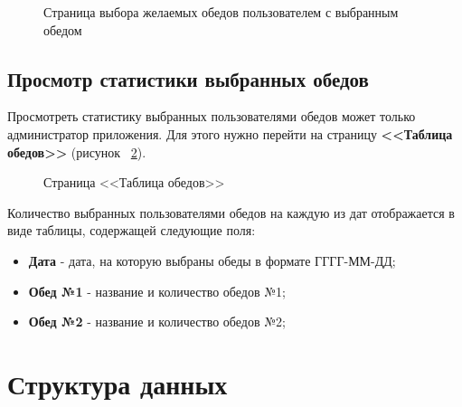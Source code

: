 \documentclass[a4paper]{article}
\begin{document}
\begin{figure}[h!]
\caption{Страница выбора желаемых обедов пользователем с выбранным обедом}
\label{fig:image17}
\end{figure}

\subsection{Просмотр статистики выбранных обедов}

Просмотреть статистику выбранных пользователями обедов может только администратор приложения. Для этого нужно перейти на страницу \textbf{<<Таблица обедов>>} (рисунок ~\ref{fig:image18}).

\begin{figure}[h]
\caption{Страница <<Таблица обедов>>}
\label{fig:image18}
\end{figure}

Количество выбранных пользователями обедов на каждую из дат отображается в виде таблицы, содержащей следующие поля:

\begin{itemize}
\setlength{\itemsep}{-2mm}
	\item \textbf{Дата} - дата, на которую выбраны обеды в формате ГГГГ-ММ-ДД;
	\item \textbf{Обед №1} - название и количество обедов №1;
	\item \textbf{Обед №2} - название и количество обедов №2;
\end{itemize}

\section{Структура данных}
\end{document}
